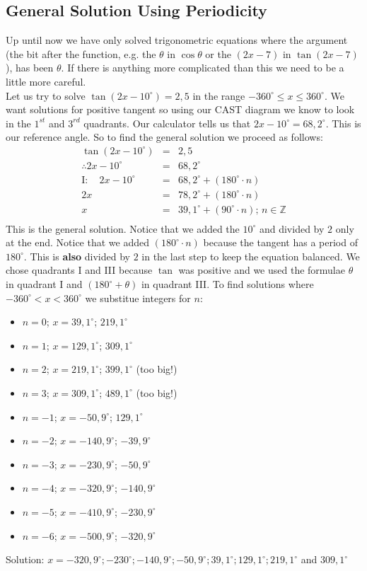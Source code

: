 \subsection{General Solution Using Periodicity}
Up until now we have only solved trigonometric equations where the argument (the bit after the function, e.g. the $\theta$ in $\cos\theta$ or the $(2x-7)$ in $\tan(2x-7)$), has been $\theta$. If there is anything more complicated than this we need to be a little more careful. \\
\newline
Let us try to solve $\tan(2x-10^\circ)=2,5$ in the range $-360^\circ \leq x \leq 360^\circ$. We want solutions for positive tangent so using our CAST diagram we know to look in the $1^{st}$ and $3^{rd}$ quadrants. Our calculator tells us that $2x-10^\circ=68,2^\circ$. This is our reference angle. So to find the general solution we proceed as follows:
 \begin{eqnarray*}
 \tan(2x-10^{\circ}) &=& 2,5\\
 \therefore 2x-10^\circ &=& 68,2^{\circ}\\
 \mathrm{I:} \quad 2x-10^{\circ}&=&68,2^{\circ}+(180^{\circ}\cdot n)\\ 2x&=&78,2^{\circ}+(180^{\circ}\cdot n)\\
 x&=&39,1^{\circ}+(90^{\circ}\cdot n)\mbox{; }n \in \mathbb{Z} \\
\end{eqnarray*}
This is the general solution. Notice that we added the $10^{\circ}$ and divided by $2$ only at the end. Notice that we added $(180^{\circ}\cdot n)$ because the tangent has a period of $180^{\circ}$. This is \textbf{also} divided by $2$ in the last step to keep the equation balanced. We chose quadrants I and III because $\tan$ was positive and we used the formulae $\theta$ in quadrant I and $(180^{\circ}+\theta)$ in quadrant III. To find solutions where $-360^{\circ}<x<360^{\circ}$ we substitue integers for $n$:
\begin{itemize} 
\item $n=0$; $x=39,1^{\circ}$; $219,1^{\circ}$
\item $n=1$; $x=129,1^{\circ}$; $309,1^{\circ}$
\item $n=2$; $x=219,1^{\circ}$; $399,1^{\circ}$ (too big!)
\item $n=3$; $x=309,1^{\circ}$; $489,1^{\circ}$ (too big!)
\item $n=-1$; $x=-50,9^{\circ}$; $129,1^{\circ}$
\item $n=-2$; $x=-140,9^{\circ}$; $-39,9^{\circ}$
\item $n=-3$; $x=-230,9^{\circ}$; $-50,9^{\circ}$
\item $n=-4$; $x=-320,9^{\circ}$; $-140,9^{\circ}$
\item $n=-5$; $x=-410,9^{\circ}$; $-230,9^{\circ}$
\item $n=-6$; $x=-500,9^{\circ}$; $-320,9^{\circ}$
\end{itemize} 
Solution: $x=-320,9^{\circ}; -230^{\circ}; -140,9^{\circ}; -50,9^{\circ}; 39,1^{\circ}; 129,1^{\circ}; 219,1^{\circ}$ and $309,1^{\circ}$

